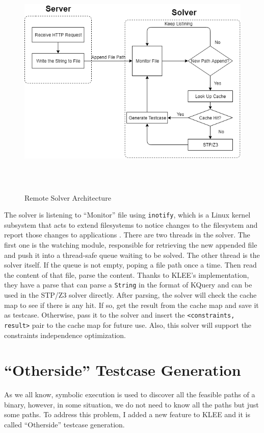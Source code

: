 \begin{figure}[h]%
\begin{center}
{\mbox{\includegraphics[height=300pt]{figures/arch.png}}}
\end{center}
\caption{\label{arch}Remote Solver Architecture}
\end{figure}

The solver is listening to ``Monitor'' file using \texttt{inotify}, which is a Linux kernel subsystem that acts to extend filesystems to notice changes to the filesystem and report those changes to applications \cite{inotify}. There are two threads in the solver. The first one is the watching module, responsible for retrieving the new appended file and push it into a thread-safe queue waiting to be solved. The other thread is the solver itself. If the queue is not empty, poping a file path once a time. Then read the content of that file, parse the content. Thanks to KLEE's implementation, they have a parse that can parse a \texttt{String} in the format of KQuery and can be used in the STP/Z3 solver directly. After parsing, the solver will check the cache map to see if there is any hit. If so, get the result from the cache map and save it as testcase. Otherwise, pass it to the solver and insert the \texttt{<constraints, result>} pair to the cache map for future use. Also, this solver will support the constraints independence optimization. 

\section{``Otherside'' Testcase Generation}
As we all know, symbolic execution is used to discover all the feasible paths of a binary, however, in some situation, we do not need to know all the paths but just some paths. To address this problem, I added a new feature to KLEE and it is called ``Otherside'' testcase generation. 

